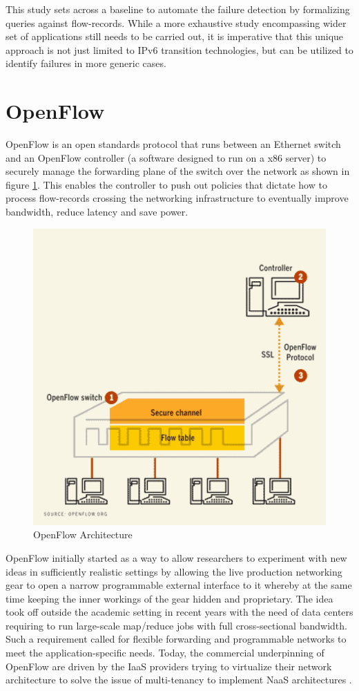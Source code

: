 This study sets across a baseline to automate the failure detection by formalizing queries against flow-records. While a more exhaustive study encompassing wider set of applications still needs to be carried out, it is imperative that this unique approach is not just limited to IPv$6$ transition technologies, but can be utilized to identify failures in more generic cases.

\section{OpenFlow}\label{sec:openflow}
OpenFlow \cite{nmckeown:2008} is an open standards protocol that runs between an Ethernet switch and an OpenFlow controller (a software designed to run on a x$86$ server) to securely manage the forwarding plane of the switch over the network as shown in figure \ref{fig:openflow-architecture}. This enables the controller to push out policies that dictate how to process flow-records crossing the networking infrastructure to eventually improve bandwidth, reduce latency and save power.
\begin{figure}[h!]
\begin{center}
  \includegraphics* [width=0.5\linewidth]{figures/openflow}
  \caption{OpenFlow Architecture \cite{newscientist:2009}}
  \label{fig:openflow-architecture}
\end{center}
\end{figure}

OpenFlow initially started as a way to allow researchers to experiment with new ideas in sufficiently realistic settings by allowing the live production networking gear to open a narrow programmable external interface to it whereby at the same time keeping the inner workings of the gear hidden and proprietary.  The idea took off outside the  academic setting in recent years with the need of data centers requiring to run large-scale map/reduce jobs with full cross-sectional bandwidth. Such a requirement called for flexible forwarding and programmable networks to meet the application-specific needs. Today, the commercial underpinning of OpenFlow are driven by the \ac{IaaS} providers trying to virtualize their network architecture to solve the issue of multi-tenancy to implement \ac{NaaS} architectures \cite{tbenson:2011}.

